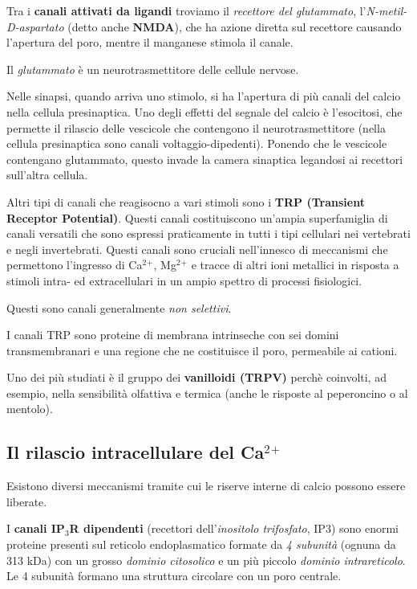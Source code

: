 \documentclass[]{article}
\begin{document}
Tra i \textbf{canali attivati da ligandi} troviamo il \emph{recettore
del glutammato}, l'\emph{N-metil-D-aspartato} (detto anche
\textbf{NMDA}), che ha azione diretta sul recettore causando l'apertura
del poro, mentre il manganese stimola il canale.

Il \emph{glutammato} è un neurotrasmettitore delle cellule nervose.

Nelle sinapsi, quando arriva uno stimolo, si ha l'apertura di più canali
del calcio nella cellula presinaptica. Uno degli effetti del segnale del
calcio è l'esocitosi, che permette il rilascio delle vescicole che
contengono il neurotrasmettitore (nella cellula presinaptica sono canali
voltaggio-dipedenti). Ponendo che le vescicole contengano glutammato,
questo invade la camera sinaptica legandosi ai recettori sull'altra
cellula.

Altri tipi di canali che reagisocno a vari stimoli sono i \textbf{TRP
(Transient Receptor Potential)}. Questi canali costituiscono un'ampia
superfamiglia di canali versatili che sono espressi praticamente in
tutti i tipi cellulari nei vertebrati e negli invertebrati. Questi
canali sono cruciali nell'innesco di meccanismi che permettono
l'ingresso di Ca\(^2\)\(^+\), Mg\(^2\)\(^+\) e tracce di altri ioni
metallici in risposta a stimoli intra- ed extracellulari in un ampio
spettro di processi fisiologici.

Questi sono canali generalmente \emph{non selettivi}.

I canali TRP sono proteine di membrana intrinseche con sei domini
transmembranari e una regione che ne costituisce il poro, permeabile ai
cationi.

Uno dei più studiati è il gruppo dei \textbf{vanilloidi (TRPV)} perchè
coinvolti, ad esempio, nella sensibilità olfattiva e termica (anche le
risposte al peperoncino o al mentolo).

\subsection{\texorpdfstring{Il rilascio intracellulare del
Ca\(^2\)\(^+\)}{Il rilascio intracellulare del Ca\^{}2\^{}+}}\label{il-rilascio-intracellulare-del-ca2}

Esistono diversi meccanismi tramite cui le riserve interne di calcio
possono essere liberate.

I \textbf{canali IP\(_3\)R dipendenti} (recettori dell'\emph{inositolo
trifosfato}, IP3) sono enormi proteine presenti sul reticolo
endoplasmatico formate da \emph{4 subunità} (ognuna da 313 kDa) con un
grosso \emph{dominio citosolico} e un più piccolo \emph{dominio
intrareticolo}. Le 4 subunità formano una struttura circolare con un
poro centrale.
\end{document}
